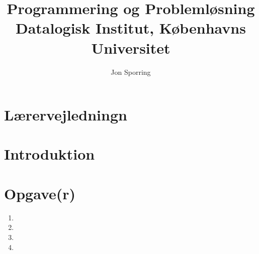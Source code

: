 \documentclass[a4paper,12pt]{article}
\title{Programmering og Problemløsning\\Datalogisk Institut,
  Københavns Universitet}
\author{Jon Sporring}
\begin{document}
\maketitle

\section{Lærervejledningn}

\section{Introduktion}

\section{Opgave(r)}
\begin{enumerate}
\item 
\item 
\item 
\item 
\end{enumerate}
\end{document}
